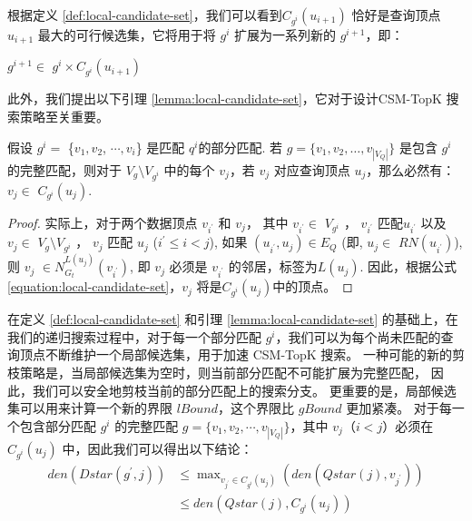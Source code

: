 根据定义 \ref{def:local-candidate-set}，我们可以看到$C_{g^i}(u_{i+1})$ 恰好是查询顶点 $u_{i+1}$ 最大的可行候选集，它将用于将 $g^i$ 扩展为一系列新的 $g^{i+1}$，即：

$g^{i+1}\in$ $g^i\times C_{g^i}(u_{i+1})$

此外，我们提出以下引理 \ref{lemma:local-candidate-set}，它对于设计CSM-TopK 搜索策略至关重要。

\begin{lemma} \label{lemma:local-candidate-set}
    假设 $g^i=$ \{$v_1, v_2$, $\cdots, v_i$\} 是匹配 $q^i$的部分匹配.
    若 $g=\{v_1, v_2, \dots, v_{|V_Q|}\}$ 是包含 $g^i$ 的完整匹配，则对于 $V_g\setminus V_{g^i}$ 中的每个 $v_j$，若 $v_j$ 对应查询顶点 $u_j$，那么必然有：
       $v_j\in$ $C_{g^i}(u_j)$.
    \end{lemma}

\begin{proof}
        实际上，对于两个数据顶点 $v_{i^\prime}$ 和 $v_j$， 其中 $v_{i^\prime}\in$ $V_{g^i}$ ，  $v_{i^\prime}$ 匹配$u_{i^\prime}$ 
            以及 $v_{j}\in$ $V_{g}\setminus V_{g^i}$ ， $v_{j}$ 匹配 $u_j$ ($i^\prime\leq i<j$), 
            如果 $(u_{i^\prime}, u_j)\in E_Q$ (即, $u_j\in$ $RN(u_{i^\prime})$), 则 $v_j$ $\in N_{G_t}^{L(u_j)}(v_{i^\prime})$, 即 $v_j$ 必须是 $v_{i^\prime}$ 的邻居，标签为$L(u_j)$. 
            因此，根据公式\ref{equation:local-candidate-set}，$v_j$ 将是$C_{g^i}(u_j)$中的顶点。
\end{proof}


在定义 \ref{def:local-candidate-set} 和引理 \ref{lemma:local-candidate-set} 的基础上，在我们的递归搜索过程中，对于每一个部分匹配 $g^i$，我们可以为每个尚未匹配的查询顶点不断维护一个局部候选集，用于加速 CSM-TopK 搜索。
一种可能的新的剪枝策略是，当局部候选集为空时，则当前部分匹配不可能扩展为完整匹配，
因此，我们可以安全地剪枝当前的部分匹配上的搜索分支。
更重要的是，局部候选集可以用来计算一个新的界限 $lBound$，这个界限比 $gBound$ 更加紧凑。
对于每一个包含部分匹配 $g^i$ 的完整匹配 $g=\{v_1, v_2, \cdots, v_{|V_Q|}\}$，其中 $v_j$（$i < j$）必须在 $C_{g^i}(u_j)$ 中，因此我们可以得出以下结论：
\begin{equation*}
    \begin{aligned}
      den(Dstar(g^\prime, j)) & \leq \max\nolimits_{v_{j^\prime}\in C_{g^i}(u_j)}\left(den(Qstar(j), v_{j^\prime})\right) \\
        & \leq den(Qstar(j), C_{g^i}(u_j))
    \end{aligned}
\end{equation*}


